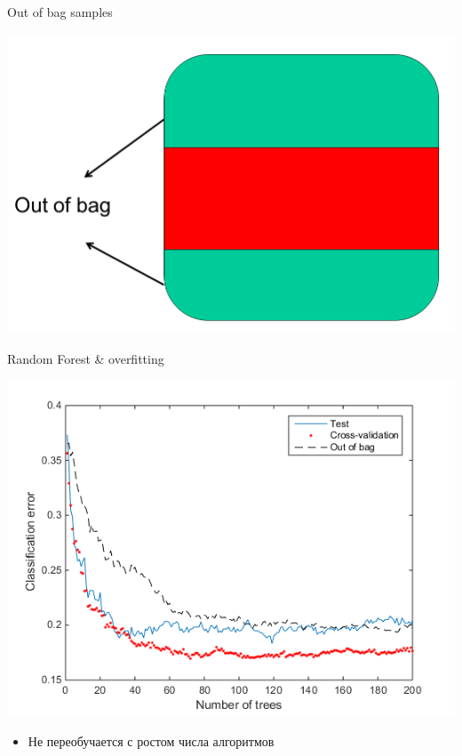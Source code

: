\documentclass[10pt]{beamer}
\begin{document}
\begin{frame}{Out of bag samples}
\begin{center}
    \includegraphics[scale=0.3]{images/outofbag.png}
\end{center}
\end{frame}

\begin{frame}{Random Forest \& overfitting}
\begin{center}
    \includegraphics[scale=0.4]{images/rfcurves.png}
\end{center}
\begin{itemize}
    \item Не переобучается с ростом числа алгоритмов
\end{itemize}
\end{frame}
\end{document}
